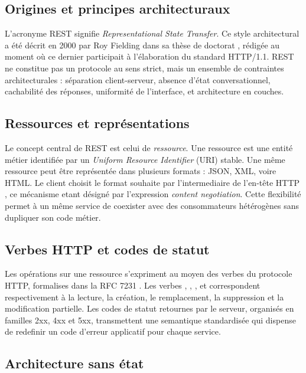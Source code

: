 \subsection{Origines et principes architecturaux}

L'acronyme REST signifie \emph{Representational State Transfer}. Ce style architectural a été décrit en 2000 par Roy Fielding dans sa thèse de doctorat \citep{fielding2000}, rédigée au moment où ce dernier participait à l'élaboration du standard HTTP/1.1. REST ne constitue pas un protocole au sens strict, mais un ensemble de contraintes architecturales : séparation client-serveur, absence d'état conversationnel, cachabilité des réponses, uniformité de l'interface, et architecture en couches.

\subsection{Ressources et représentations}

Le concept central de REST est celui de \emph{ressource}. Une ressource est une entité métier identifiée par un \emph{Uniform Resource Identifier} (URI) stable. Une même ressource peut être représentée dans plusieurs formats : JSON, XML, voire HTML. Le client choisit le format souhaite par l'intermediaire de l'en-tête HTTP , ce mécanisme etant désigné par l'expression \emph{content negotiation}. Cette flexibilité permet à un même service de coexister avec des consommateurs hétérogènes sans dupliquer son code métier.

\subsection{Verbes HTTP et codes de statut}

Les opérations sur une ressource s'expriment au moyen des verbes du protocole HTTP, formalises dans la RFC 7231 \citep{rfc7231}. Les verbes , , ,  et  correspondent respectivement à la lecture, la création, le remplacement, la suppression et la modification partielle. Les codes de statut retournes par le serveur, organisés en familles 2xx, 4xx et 5xx, transmettent une semantique standardisée qui dispense de redefinir un code d'erreur applicatif pour chaque service.

\subsection{Architecture sans état}


